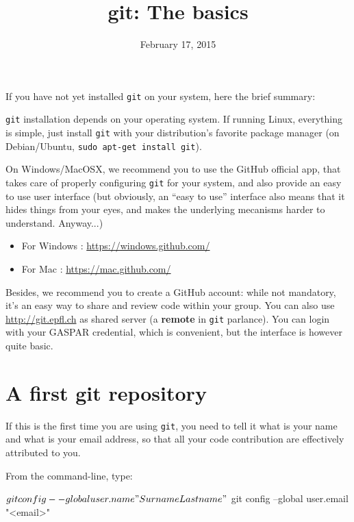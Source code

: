 \documentclass{instructions}
\title{git: The basics}
\date{February 17, 2015}
\newcommand{\git}{\texttt{git}\xspace}
\begin{document}
\maketitle

\intro

If you have not yet installed \git on your system, here the brief
summary:

\git installation depends on your operating system. If running Linux,
everything is simple, just install \git with your distribution's
favorite package manager (on Debian/Ubuntu,
\texttt{sudo apt-get install git}).

On Windows/MacOSX, we recommend you to use the GitHub official app, that takes
care of properly configuring \git for your system, and also provide an
easy to use user interface (but obviously, an ``easy to use'' interface also means
that it hides things from your eyes, and makes the underlying mecanisms harder to
understand. Anyway...)

\begin{itemize}
\item For Windows : \url{https://windows.github.com/}
\item For Mac : \url{https://mac.github.com/}
\end{itemize}


Besides, we recommend you to create a GitHub account: while not mandatory, it's
an easy way to share and review code within your group. You can also use
\url{http://git.epfl.ch} as shared server (a \textbf{remote} in \git parlance).
You can login with your GASPAR credential, which is convenient, but the
interface is however quite basic.

\part{A first git repository}


If this is the first time you are using \git, you need to tell it what is your
name and what is your email address, so that all your code contribution are
effectively attributed to you.

From the command-line, type:


\begin{shcode}
$ git config --global user.name "Surname Lastname"
$ git config --global user.email "<email>"
\end{shcode}
\end{document}
